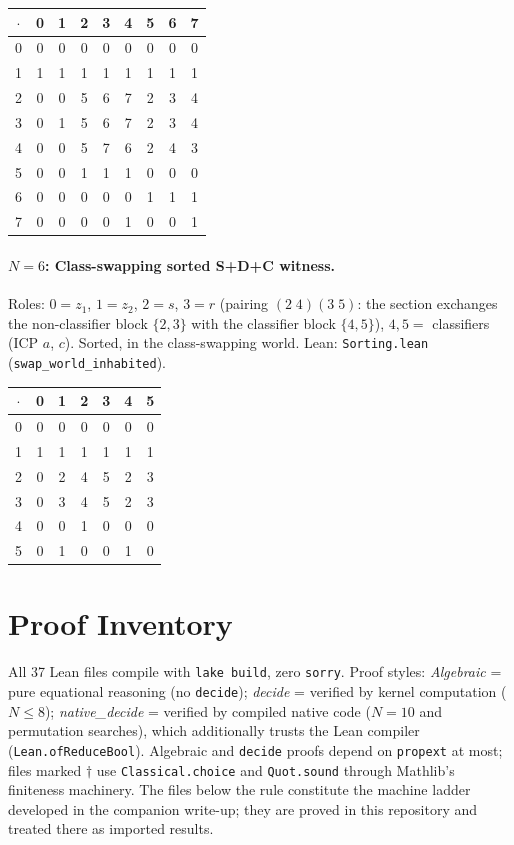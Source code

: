 \documentclass[sigconf,screen]{acmart}
\newcommand{\dotop}{\cdot}
\theoremstyle{remark}
\begin{document}
\medskip
{\small
\begin{tabular}{c|cccccccc}
$\dotop$ & 0 & 1 & 2 & 3 & 4 & 5 & 6 & 7 \\\hline
0 & 0 & 0 & 0 & 0 & 0 & 0 & 0 & 0 \\
1 & 1 & 1 & 1 & 1 & 1 & 1 & 1 & 1 \\
2 & 0 & 0 & 5 & 6 & 7 & 2 & 3 & 4 \\
3 & 0 & 1 & 5 & 6 & 7 & 2 & 3 & 4 \\
4 & 0 & 0 & 5 & 7 & 6 & 2 & 4 & 3 \\
5 & 0 & 0 & 1 & 1 & 1 & 0 & 0 & 0 \\
6 & 0 & 0 & 0 & 0 & 0 & 1 & 1 & 1 \\
7 & 0 & 0 & 0 & 0 & 1 & 0 & 0 & 1 \\
\end{tabular}}

\paragraph{$N\!=\!6$: Class-swapping sorted S+D+C witness.}
Roles: $0 = z_1$, $1 = z_2$, $2 = s$, $3 = r$ (pairing $(2\;4)(3\;5)$: the section exchanges the non-classifier block $\{2,3\}$ with the classifier block $\{4,5\}$), $4, 5 =$ classifiers (ICP $a$, $c$). Sorted, in the class-swapping world. \quad Lean: \texttt{Sorting.lean} (\texttt{swap\_world\_inhabited}).

\medskip
{\small
\begin{tabular}{c|cccccc}
$\dotop$ & 0 & 1 & 2 & 3 & 4 & 5 \\\hline
0 & 0 & 0 & 0 & 0 & 0 & 0 \\
1 & 1 & 1 & 1 & 1 & 1 & 1 \\
2 & 0 & 2 & 4 & 5 & 2 & 3 \\
3 & 0 & 3 & 4 & 5 & 2 & 3 \\
4 & 0 & 0 & 1 & 0 & 0 & 0 \\
5 & 0 & 1 & 0 & 0 & 1 & 0 \\
\end{tabular}}

\section{Proof Inventory}
\label{app:inventory}

All 37 Lean files compile with \texttt{lake build}, zero \texttt{sorry}.
Proof styles: \emph{Algebraic} = pure equational reasoning (no
\texttt{decide}); \emph{decide} = verified by kernel computation
($N \leq 8$); \emph{native\_decide} = verified by compiled native code
($N = 10$ and permutation searches), which additionally trusts the Lean
compiler (\texttt{Lean.ofReduceBool}). Algebraic and \texttt{decide}
proofs depend on \texttt{propext} at most; files marked $\dagger$ use
\texttt{Classical.choice} and \texttt{Quot.sound} through Mathlib's
finiteness machinery. The files below the rule constitute the machine
ladder developed in the companion write-up; they are proved in this
repository and treated there as imported results.
\end{document}
